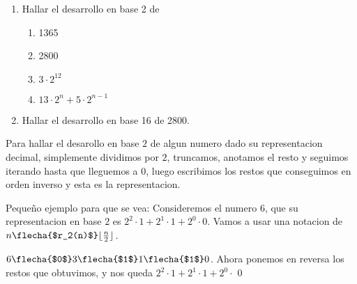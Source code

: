 
\begin{enunciado}{\ejercicio}
        \begin{enumerate}[label=(\alph*)]
    \item Hallar el desarrollo en base 2 de
          \begin{multicols}{4}
            \begin{enumerate}[label=\roman*.]
              \item 1365
              \item 2800
              \item $3\cdot 2^{12}$
              \item $13 \cdot 2^n + 5 \cdot 2^{n-1}$
            \end{enumerate}
          \end{multicols}

  \item Hallar el desarrollo en base 16 de 2800.
  \end{enumerate}
\end{enunciado}

Para hallar el desarollo en base $2$ de algun numero dado su representacion decimal, simplemente dividimos por $2$, truncamos, anotamos el resto 
y seguimos iterando hasta que lleguemos a $0$, luego escribimos los restos que conseguimos en orden inverso y esta es la representacion. 

Pequeño ejemplo para que se vea: Consideremos el numero $6$, que su representacion en base $2$ es $2^2 \cdot 1 + 2^1 \cdot 1 + 2^0 \cdot 0$.
Vamos a usar una notacion de $n \flecha{$r_2(n)$} \lfloor \frac{n}{2} \rfloor$. 

$6 \flecha{$0$} 3 \flecha{$1$} 1 \flecha{$1$} 0$. Ahora ponemos en reversa los restos que obtuvimos, y nos queda 
$2^2 \cdot 1 + 2^1 \cdot 1 + 2^0 \cdot$ 0

